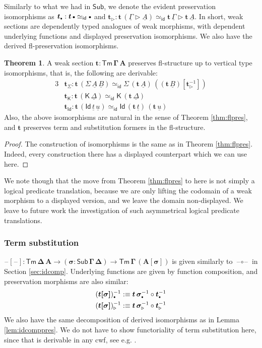 \documentclass[12pt,a4paper,twoside,openany]{book}
\theoremstyle{remark}
\theoremstyle{definition}
\theoremstyle{theorem}
\newtheorem{theorem}{Theorem}
\newcommand{\bs}[1]{\boldsymbol{#1}}
\newcommand{\id}{\mathsf{id}}
\newcommand{\Sub}{\mathsf{Sub}}
\newcommand{\Tm}{\mathsf{Tm}}
\newcommand{\Id}{\mathsf{Id}}
\newcommand{\blank}{\mathord{\hspace{1pt}\text{--}\hspace{1pt}}}
\newcommand{\ra}{\rightarrow}
\newcommand{\ext}{\triangleright}
\newcommand{\emptycon}{\scaleobj{.75}\bullet}
\newcommand{\K}{\mathsf{K}}
\newcommand{\bSub}{\bs{\Sub}}
\newcommand{\bsigma}{\bs{\sigma}}
\newcommand{\bt}{\bs{t}}
\newcommand{\ul}[1]{\underline{#1}}
\newcommand{\ulGamma}{\ul{\Gamma}}
\newcommand{\ulDelta}{\ul{\Delta}}
\newcommand{\ult}{\ul{t}}
\newcommand{\ulu}{\ul{u}}
\newcommand{\ulA}{\ul{A}}
\newcommand{\ulB}{\ul{B}}
\newcommand{\defn}{:\equiv}
\begin{document}
Similarly to what we had in $\bSub$, we denote the evident preservation
isomorphisms as $\bt_{\emptycon} : \bt\,\emptycon \simeq_{\id} \emptycon$ and
$\bt_{\ext} : \bt\,(\ulGamma\ext \ulA) \simeq_{\id} \bt\,\ulGamma \ext
\bt\,\ulA$. In short, weak sections are dependently typed analogues of weak
morphisms, with dependent underlying functions and displayed preservation
isomorphisms. We also have the derived fl-preservation isomorphisms.

\begin{theorem} A weak section $\bs{t : \Tm\,\Gamma\,A}$ preserves fl-structure up to vertical type isomorphisms, that is, the following are derivable:
\begin{alignat*}{3}
  & \bt_{\Sigma} : \bt\,(\Sigma\,\ulA\,\ulB) \simeq_{\id} \Sigma\,(\bt\,\ulA)\,((\bt\,\ulB)[\bt_{\ext}^{-1}]) \\
  & \bt_{\K} : \bt\,(\K\,\ulDelta) \simeq_{\id} \K\,(\bt\,\ulDelta) \\
  & \bt_{\Id} : \bt\,(\Id\,\ult\,\ulu) \simeq_{\id} \Id\,(\bt\,\ult)\,(\bt\,\ulu)
\end{alignat*}
Also, the above isomorphisms are natural in the sense of Theorem
\ref{thm:flpres}, and $\bt$ preserves term and substitution formers in the
fl-structure.
\end{theorem}
\begin{proof}
The construction of isomorphisms is the same as in Theorem
\ref{thm:flpres}. Indeed, every construction there has a displayed counterpart
which we can use here.
\end{proof}

We note though that the move from Theorem \ref{thm:flpres} to here is not simply
a logical predicate translation, because we are only lifting the codomain of a
weak morphism to a displayed version, and we leave the domain non-displayed. We
leave to future work the investigation of such asymmetrical logical predicate
translations.



\subsubsection{Term substitution}

$\bs{\blank[\blank] : \Tm\,\Delta\,A \ra (\sigma : \Sub\,\Gamma\,\Delta)
  \ra \Tm\,\Gamma\,(A[\sigma])}$ is given similarly to
$\bs{\blank\!\circ\!\blank}$ in Section \ref{sec:idcomp}. Underlying functions
are given by function composition, and preservation morphisms are also similar:
\begin{alignat*}{3}
  & (\bs{t[\sigma]})_{\emptycon}^{-1} \defn
    \bt\,\bsigma_{\emptycon}^{-1} \circ \bt_{\emptycon}^{-1} \\
  & (\bs{t[\sigma]})_{\ext}^{-1} \defn
    \bt\,\bsigma_{\ext}^{-1} \circ \bt_{\ext}^{-1}
\end{alignat*}
We also have the same decomposition of derived isomorphisms as in Lemma
\ref{lem:idcomppres}. We do not have to show functoriality of term substitution
here, since that is derivable in any cwf, see e.g. \cite{kaposi2019constructing}.
\end{document}
